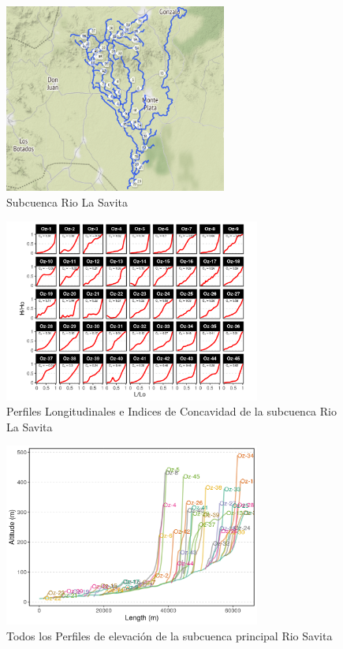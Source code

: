 \documentclass[11pt,]{article}
\begin{document}
\begin{figure}
\centering
\includegraphics[width=0.65000\textwidth]{Productos Generados/p_Savita.png}
\caption{\label{fig:LFP_Savita0} Subcuenca Rio La Savita}
\end{figure}

\begin{figure}
\centering
\includegraphics[width=0.75000\textwidth]{Productos Generados/p_c_savita1.png}
\caption{\label{fig:LFP_Savita1} Perfiles Longitudinales e Indices de
Concavidad de la subcuenca Rio La Savita}
\end{figure}

\begin{figure}
\centering
\includegraphics[width=0.75000\textwidth]{Productos Generados/p_c_savita.png}
\caption{\label{fig:LFP_Savita2} Todos los Perfiles de elevación de la
subcuenca principal Rio Savita}
\end{figure}
\end{document}
